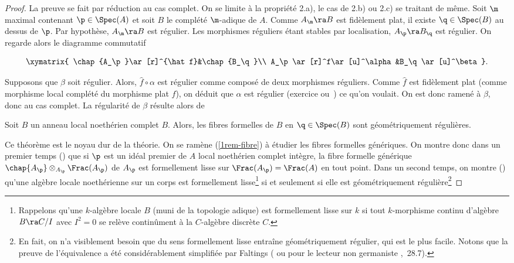 \documentclass[10pt]{../fichiers-configuration-latex/smfart}
\begin{document}
\begin{proof} La preuve se fait par réduction au cas complet. On se limite à la propriété 2.a), le
cas de 2.b) ou 2.c) se traitant de même. Soit $\m$ maximal contenant $\p\in\Spec(A)$ et soit $B$ le
complété $\m$-adique de $A$. Comme $A_\m\ra B$ est fidèlement plat, il existe $\q\in\Spec(B)$ au
dessus de $\p$. Par hypothèse, $A_\m\ra B$ est régulier. Les morphismes réguliers étant stables par
localisation, $A_\p\ra B_\q$ est régulier. On regarde alors le diagramme commutatif

$$\xymatrix{ \chap{A_\p}\ar[r]^{\hat f}&\chap{B_\q}\\ A_\p\ar[r]^f\ar[u]^\alpha&B_\q\ar[u]^\beta}.$$

Supposons que $\beta$ soit régulier. Alors, $\hat f\circ\alpha$ est régulier comme composé de deux
morphismes réguliers. Comme $\hat f$ est fidèlement plat (comme morphisme local  complété du
morphisme plat $f$), on déduit que $\alpha$ est régulier (exercice ou~) ce qu'on
voulait. On est donc ramené à $\beta$, donc au cas complet. La régularité de $\beta$ résulte alors
de

\begin{theoreme2}\label{1perm-fib-form-loc}Soit $B$ un anneau local noethérien complet $B$. Alors,
les fibres formelles de $B$ en $\q\in\Spec(B)$ sont géométriquement régulières.\end{theoreme2}

Ce théorème est le noyau dur de la théorie. On se ramène (\ref{1rem-fibre}) à étudier les fibres
formelles génériques. On montre donc dans un premier temps () que si $\p$ est
un idéal premier de $A$  local noethérien complet intègre, la fibre formelle générique
$\chap{A_\p}\otimes_{A_\p}\Frac(A_\p)$  de $A_\p$ est formellement lisse sur $\Frac(A_\p)=\Frac(A)$
en tout point. Dans un second temps, on montre () qu'une algèbre locale
noethérienne sur un corps est formellement lisse\footnote{Rappelons qu'une $k$-algèbre locale $B$
(muni de la topologie adique) est formellement lisse  sur $k$ si tout $k$-morphisme continu
d'algèbre $B\ra C/I$ avec $I^2=0$ se relève continûment à la $C$-algèbre discrète $C$.} si et
seulement si elle est géométriquement régulière\footnote{En fait, on n'a visiblement besoin que du
sens formellement lisse entraîne géométriquement régulier, qui est le plus facile. Notons que la
preuve de l'équivalence a été considérablement simplifiée par Faltings (\cite{Fal78} ou pour le
lecteur non germaniste \cite{CRT@Matsumura},~28.7).} \end{proof}
\end{document}
